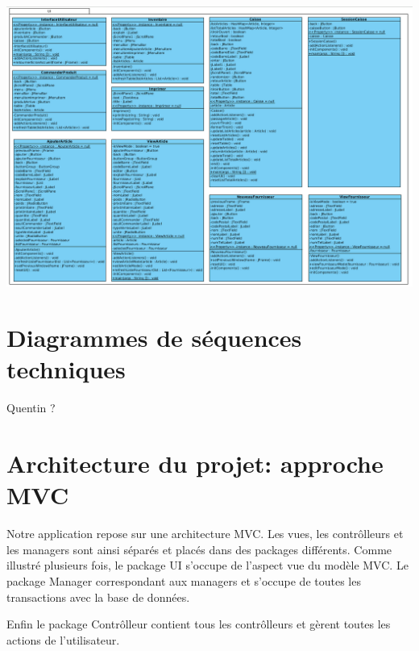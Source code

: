 \begin{center}
\includegraphics[width=14cm]{./Conception/ui}
\end{center}


\section{Diagrammes de séquences techniques}

Quentin ?

\section{Architecture du projet: approche MVC}
Notre application repose sur une architecture MVC. Les vues, les contrôlleurs et les managers sont ainsi séparés et placés dans des packages différents.
Comme illustré plusieurs fois, le package UI s'occupe de l'aspect vue du modèle MVC.
Le package Manager correspondant aux managers et s'occupe de toutes les transactions avec la base de données.

Enfin le package Contrôlleur contient tous les contrôlleurs et gèrent toutes les actions de l'utilisateur. 
